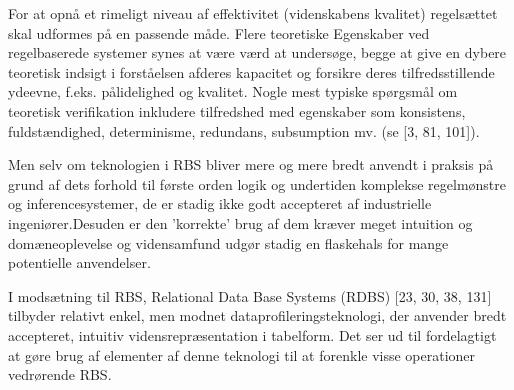 For at opnå et rimeligt niveau af effektivitet (videnskabens kvalitet)
regelsættet skal udformes på en passende måde. Flere teoretiske
Egenskaber ved regelbaserede systemer synes at være værd at undersøge, begge
at give en dybere teoretisk indsigt i forståelsen af ​​deres kapacitet
og forsikre deres tilfredsstillende ydeevne, f.eks. pålidelighed og kvalitet. Nogle mest typiske spørgsmål om teoretisk verifikation
inkludere tilfredshed med egenskaber som konsistens, fuldstændighed, determinisme,
redundans, subsumption mv. (se [3, 81, 101]).

Men selv om teknologien i RBS bliver
mere og mere bredt anvendt i praksis på grund af dets forhold til første orden
logik og undertiden komplekse regelmønstre og inferencesystemer, de er stadig ikke godt accepteret af industrielle ingeniører.Desuden er den 'korrekte' brug af dem kræver meget intuition og domæneoplevelse og vidensamfund
udgør stadig en flaskehals for mange potentielle anvendelser.

I modsætning til RBS, Relational Data Base Systems (RDBS) [23, 30, 38, 131]
tilbyder relativt enkel, men modnet dataprofileringsteknologi, der anvender
bredt accepteret, intuitiv vidensrepræsentation i tabelform. Det ser ud til
fordelagtigt at gøre brug af elementer af denne teknologi til at forenkle visse
operationer vedrørende RBS.


%
%
%

